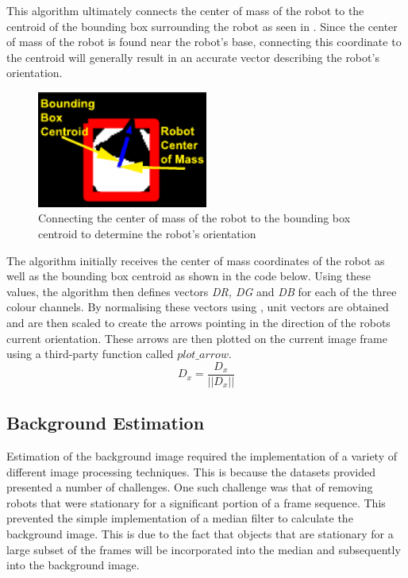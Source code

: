 \documentclass{article}
\begin{document}
This algorithm ultimately connects the center of mass of the robot to the centroid of the bounding box surrounding the robot as seen in . Since the center of mass of the robot is found near the robot's base, connecting this coordinate to the centroid will generally result in an accurate vector describing the robot's orientation.\\

\begin{figure}[h!]
	\centering
		\includegraphics[width=0.5\textwidth]{../Drawings/orientationAlgorithm.pdf}
	\caption{Connecting the center of mass of the robot to the bounding box centroid to determine the robot's orientation}
	\label{fig:orientation}
\end{figure}

The algorithm initially receives the center of mass coordinates of the robot as well as the bounding box centroid as shown in the code below. Using these values, the algorithm then defines vectors \textit{DR, DG} and \textit{DB} for each of the three colour channels. By normalising these vectors using , unit vectors are obtained and are then scaled to create the arrows pointing in the direction of the robots current orientation. These arrows are then plotted on the current image frame using a third-party function called \textit{$plot\_arrow$}.\\

\begin{equation}
D_{x} = \frac{D_{x}}{\vert\vert D_{x} \vert\vert}
\label{eqn:norm}
\end{equation}



\subsection{Background Estimation}
\label{sec:back}
Estimation of the background image required the implementation of a variety of different image processing techniques. This is because the datasets provided presented a number of challenges. One such challenge was that of removing robots that were stationary for a significant portion of a frame sequence. This prevented the simple implementation of a median filter to calculate the background image. This is due to the fact that objects that are stationary for a large subset of the frames will be incorporated into the median and subsequently into the background image.\\
\end{document}
